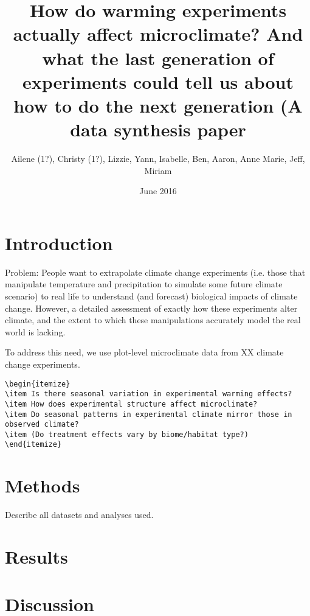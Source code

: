\documentclass[11pt]{article}
\begin{document}
\title{How do warming experiments actually affect microclimate? And what the last generation of experiments could tell us about how to do the next generation (A data synthesis paper}
\author{Ailene (1?), Christy (1?), Lizzie, Yann, Isabelle, Ben, Aaron, Anne Marie, Jeff, Miriam}
\date{June 2016}
\maketitle  %
\section{Introduction}
Problem: 
People want to extrapolate climate change experiments (i.e. those that manipulate temperature and precipitation to simulate some future climate scenario) to real life to understand (and forecast) biological impacts of climate change. However, a detailed assessment of exactly how these experiments alter climate, and the extent to which these manipulations accurately model the real world is lacking. 

To address this need, we use plot-level microclimate data from XX climate change experiments. 

\Ex 
\begin{verbatim}
\begin{itemize}
\item Is there seasonal variation in experimental warming effects?
\item How does experimental structure affect microclimate?
\item Do seasonal patterns in experimental climate mirror those in observed climate?
\item (Do treatment effects vary by biome/habitat type?)
\end{itemize}
\end{verbatim}
\section{Methods}
Describe all datasets and analyses used.
\section{Results}
\section{Discussion}
\end{document}
